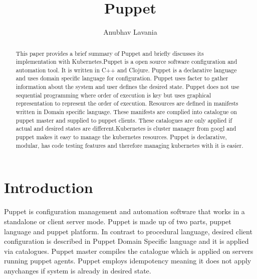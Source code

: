 \title{Puppet}


\author{Anubhav Lavania}


\renewcommand{\shortauthors}{G. v. Laszewski}


\begin{abstract}
  This paper provides a brief summary of Puppet and briefly discusses its
  implementation with Kubernetes.Puppet is a open source software configuration
  and automation tool. It is written in C++ and Clojure. Puppet is a declarative
  language and uses domain specific language for configuration. Puppet uses
  facter to gather information about the system and user defines the desired
  state. Puppet does not use sequential programming where order of execution is
  key but uses graphical representation to represent the order of
  execution. Resources are defined in manifests written in Domain specific
  language. These manifests are complied into catalogue on puppet master and
  supplied to puppet clients. These catalogues are only applied if actual and
  desired states are different.Kubernetes is cluster manager from googl and
  puppet makes it easy to manage the kubernetes resources. Puppet is
  declarative, modular, has code testing features and therefore managing
  kubernetes with it is easier.
\end{abstract}



\maketitle



\section{Introduction}

Puppet is configuration management and automation software that works in a
standalone or client server mode. Puppet is made up of two parts, puppet
language and puppet platform. In contrast to procedural language, desired client
configuration is described in Puppet Domain Specific language and it is applied
via catalogues. Puppet master compiles the catalogue which is applied on servers
running puppet agents. Puppet employs idempotency meaning it does not apply anychanges if system is already in desired state.

